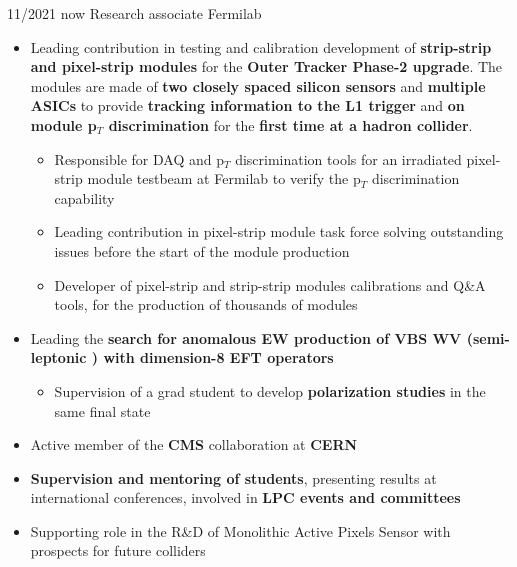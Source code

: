   \position
  {11/2021  \textemdash{} now} 
   {Research associate}
   {Fermilab}
{\begin{itemize}

\item Leading contribution in testing and calibration development of {\bf strip-strip and pixel-strip modules} for the {\bf Outer Tracker Phase-2 upgrade}. The modules are made of {\bf two closely spaced silicon sensors} and {\bf multiple ASICs} to provide {\bf tracking information to the L1 trigger} and {\bf on module p$_{T}$ discrimination} for the {\bf first time at a hadron collider}.
\begin{itemize}
\item Responsible for DAQ and p$_{T}$ discrimination tools for an irradiated pixel-strip module testbeam at Fermilab to verify the p$_{T}$ discrimination capability
\item Leading contribution in pixel-strip module task force solving outstanding issues before the start of the module production
\item Developer of pixel-strip and strip-strip modules calibrations and Q\&A tools, for the production of thousands of modules
\end{itemize}
\item Leading the {\bf search for anomalous EW production of VBS WV (semi-leptonic ) with dimension-8 EFT operators}
\begin{itemize}
\item Supervision of a grad student to develop {\bf polarization studies} in the same final state
\end{itemize}
\item Active member of the {\bf CMS} collaboration at {\bf CERN}
\item {\bf Supervision and mentoring of students}, presenting results at international conferences,  involved in {\bf LPC events and committees}
\item Supporting role in the R\&D of Monolithic Active Pixels Sensor with prospects for future colliders
\end{itemize}
}

